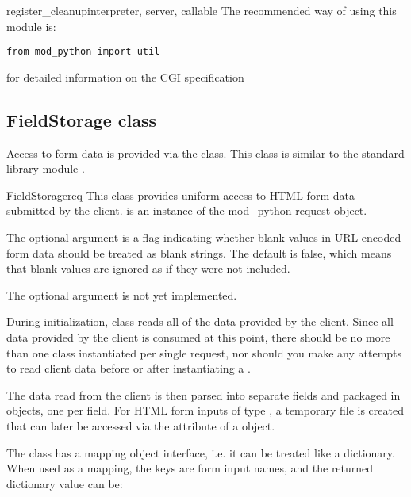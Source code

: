 \begin{funcdesc}{register_cleanup}{interpreter, server, callable}
The recommended way of using this module is:
\begin{verbatim}
from mod_python import util
\end{verbatim}

\begin{seealso}
           {for detailed information on the CGI specification}
\end{seealso}

\subsection{FieldStorage class\label{pyapi-util-fstor}}

Access to form data is provided via the 
class. This class is similar to the standard library module
 .

\begin{classdesc}{FieldStorage}{req}
  This class provides uniform access to HTML form data submitted by the
  client.   is an instance of the mod_python request object.

  The optional argument  is a flag indicating
  whether blank values in URL encoded form data should be treated as
  blank strings. The default is false, which means that blank values are
  ignored as if they were not included.

  The optional argument  is not yet implemented.

  During initialization,  class reads all of the
  data provided by the client. Since all data provided by the client is
  consumed at this point, there should be no more than one
   class instantiated per single request, nor should
  you make any attempts to read client data before or after
  instantiating a .

  The data read from the client is then parsed into separate fields and
  packaged in  objects, one per field. For HTML form inputs
  of type , a temporary file is created that can later be
  accessed via the  attribute of a  object.

  The  class has a mapping object interface, i.e. it
  can be treated like a dictionary. When used as a mapping, the keys are
  form input names, and the returned dictionary value can be:


\end{classdesc}
\end{funcdesc}
